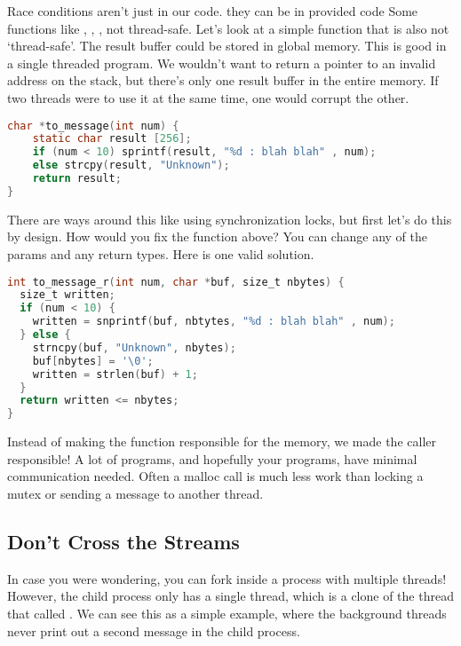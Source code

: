 Race conditions aren't just in our code.
they can be in provided code
Some functions like , , ,  not thread-safe.
Let's look at a simple function that is also not `thread-safe'.
The result buffer could be stored in global memory.
This is good in a single threaded program.
We wouldn't want to return a pointer to an invalid address on the stack, but there's only one result buffer in the entire memory.
If two threads were to use it at the same time, one would corrupt the other.

\begin{lstlisting}[language=C]
char *to_message(int num) {
    static char result [256];
    if (num < 10) sprintf(result, "%d : blah blah" , num);
    else strcpy(result, "Unknown");
    return result;
}
\end{lstlisting}

There are ways around this like using synchronization locks, but first let's do this by design.
How would you fix the function above?
You can change any of the params and any return types.
Here is one valid solution.

\begin{lstlisting}[language=C]
int to_message_r(int num, char *buf, size_t nbytes) {
  size_t written;
  if (num < 10) {
    written = snprintf(buf, nbtytes, "%d : blah blah" , num);
  } else {
    strncpy(buf, "Unknown", nbytes);
    buf[nbytes] = '\0';
    written = strlen(buf) + 1;
  }
  return written <= nbytes;
}
\end{lstlisting}

Instead of making the function responsible for the memory, we made the caller responsible!
A lot of programs, and hopefully your programs, have minimal communication needed.
Often a malloc call is much less work than locking a mutex or sending a message to another thread.

\subsection{Don't Cross the Streams}

In case you were wondering, you can fork inside a process with multiple threads!
However, the child process only has a single thread, which is a clone of the thread that called .
We can see this as a simple example, where the background threads never print out a second message in the child process.

